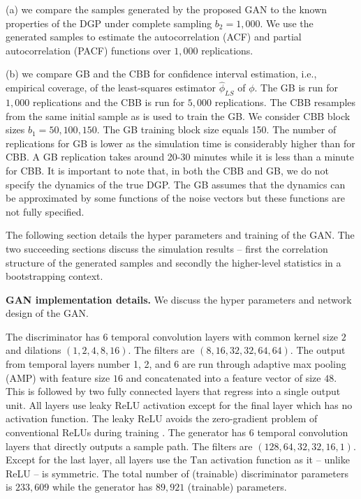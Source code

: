 \documentclass[12pt]{article}
\begin{document}
(a) we compare the samples generated by the proposed GAN to the known properties of the DGP under complete sampling $b_2 = 1,000$. We use the generated samples to estimate the autocorrelation (ACF) and partial autocorrelation (PACF) functions over $1,000$ replications. 

(b) we compare GB and the CBB for confidence interval estimation, i.e., empirical coverage, of the least-squares estimator $\hat{\phi}_{LS}$ of $\phi$. The GB is run for $1,000$ replications and the CBB is run for $5,000$ replications. The CBB resamples from the same initial sample as is used to train the GB. We consider CBB block sizes $b_1 = 50,100,150$. The GB training block size equals 150. The number of replications for GB is lower as the simulation time is considerably higher than for CBB. A GB replication takes around 20-30 minutes while it is less than a minute for CBB. It is important to note that, in both the CBB and GB, we do not specify the dynamics of the true DGP. The GB assumes that the dynamics can be approximated by some functions of the noise vectors but these functions are not fully specified. 

The following section details the hyper parameters and training of the GAN. The two succeeding sections discuss the simulation results -- first the correlation structure of the generated samples and secondly the higher-level statistics in a bootstrapping context. 

\textbf{GAN implementation details.} We discuss the hyper parameters and network design of the GAN.

The discriminator has 6 temporal convolution layers with common kernel size $2$ and dilations $(1, 2, 4, 8, 16)$. The filters are $(8, 16, 32, 32, 64, 64)$. The output from temporal layers number 1, 2, and 6 are run through adaptive max pooling (AMP) with feature size $16$ and concatenated into a feature vector of size $48$. This is followed by two fully connected layers that regress into a single output unit. All layers use leaky ReLU activation \citep{maas2013rectifier} except for the final layer which has no activation function. The leaky ReLU avoids the zero-gradient problem of conventional ReLUs during training \citep{maas2013rectifier}. The generator has 6 temporal convolution layers that directly outputs a sample path. The filters are $(128, 64, 32, 32, 16, 1)$. Except for the last layer, all layers use the $\text{Tan}$ activation function as it -- unlike ReLU -- is symmetric. The total number of (trainable) discriminator parameters is $233,609$ while the generator has $89,921$ (trainable) parameters.
\end{document}
